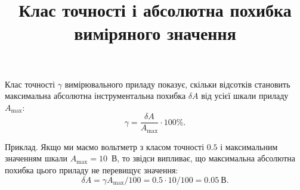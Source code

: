 \documentclass[14pt]{extarticle}
\title{Клас точності і абсолютна похибка виміряного значення}
\author{}
\begin{document}
\maketitle

Клас точності $\gamma$ вимірювального приладу показує, скільки відсотків становить максимальна абсолютна інструментальна похибка $\delta A$ від усієї шкали приладу $A_{\max}$:
\begin{equation}\label{key}
    \gamma = \frac{\delta A}{A_{\max}}\cdot 100 \%.
\end{equation}

Приклад. Якщо ми маємо вольтметр з класом точності $0.5$ і максимальним значенням шкали $A_{\max} = 10$~В, то звідси випливає, що максимальна абсолютна похибка цього приладу не перевищує значення:
\begin{equation}\label{key}
    \delta A = \gamma A_{\max} / 100 = 0.5 \cdot 10 /100 = 0.05~\text{В}.
\end{equation} 
\end{document}
